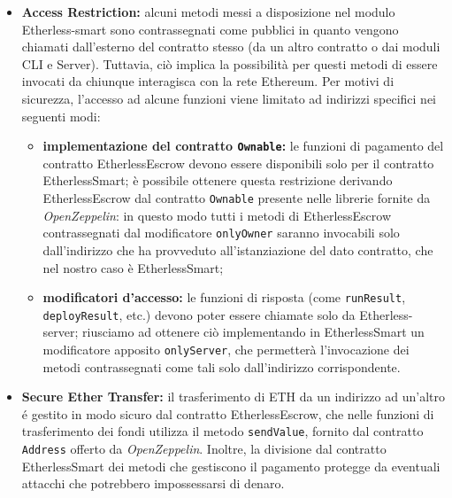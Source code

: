   \begin{itemize}

    \item \textbf{Access Restriction:} alcuni metodi messi a disposizione nel modulo Etherless-smart sono contrassegnati come pubblici in quanto vengono chiamati dall'esterno del contratto stesso (da un altro contratto o dai moduli CLI e Server). Tuttavia, ciò implica la possibilità per questi metodi di essere invocati da chiunque interagisca con la rete Ethereum. Per motivi di sicurezza, l'accesso ad alcune funzioni viene limitato ad indirizzi specifici nei seguenti modi:
      \begin{itemize}
        \item \textbf{implementazione del contratto \texttt{Ownable}:} le funzioni di pagamento del contratto EtherlessEscrow devono essere disponibili solo per il contratto EtherlessSmart; è possibile ottenere questa restrizione derivando EtherlessEscrow dal contratto \texttt{Ownable} presente nelle librerie fornite da \textit{OpenZeppelin}: in questo modo tutti i metodi di EtherlessEscrow contrassegnati dal modificatore \texttt{onlyOwner} saranno invocabili solo dall'indirizzo che ha provveduto all'istanziazione del dato contratto, che nel nostro caso è EtherlessSmart;
        \item \textbf{modificatori d'accesso:} le funzioni di risposta (come \texttt{runResult}, \texttt{deployResult}, etc.) devono poter essere chiamate solo da Etherless-server; riusciamo ad ottenere ciò implementando in EtherlessSmart un modificatore apposito \texttt{onlyServer}, che permetterà l'invocazione dei metodi contrassegnati come tali solo dall'indirizzo corrispondente.
      \end{itemize}

    \item \textbf{Secure Ether Transfer:} il trasferimento di ETH da un indirizzo ad un'altro é gestito in modo sicuro dal contratto EtherlessEscrow, che nelle funzioni di trasferimento dei fondi utilizza il metodo \texttt{sendValue}, fornito dal contratto \texttt{Address} offerto da \textit{OpenZeppelin}. Inoltre, la divisione dal contratto EtherlessSmart dei metodi che gestiscono il pagamento protegge da eventuali attacchi che potrebbero impossessarsi di denaro.


\end{itemize}
